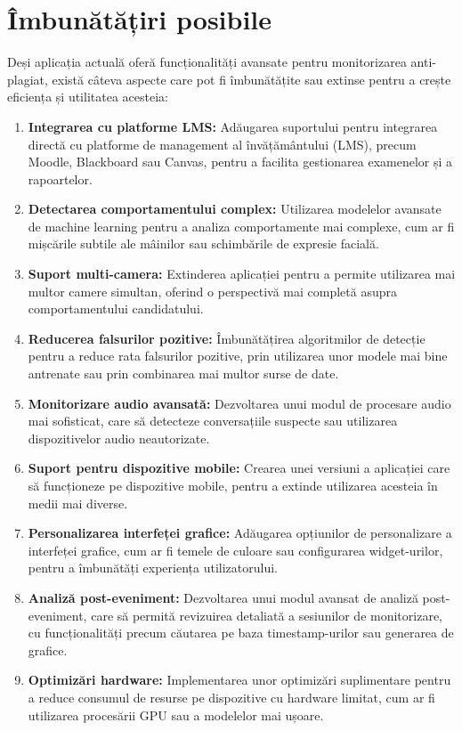 \documentclass[12pt,a4paper]{article}
\begin{document}
\section{Îmbunătățiri posibile}

Deși aplicația actuală oferă funcționalități avansate pentru monitorizarea anti-plagiat, există câteva aspecte care pot fi îmbunătățite sau extinse pentru a crește eficiența și utilitatea acesteia:

\begin{enumerate}
    \item \textbf{Integrarea cu platforme LMS:} Adăugarea suportului pentru integrarea directă cu platforme de management al învățământului (LMS), precum Moodle, Blackboard sau Canvas, pentru a facilita gestionarea examenelor și a rapoartelor.

    \item \textbf{Detectarea comportamentului complex:} Utilizarea modelelor avansate de machine learning pentru a analiza comportamente mai complexe, cum ar fi mișcările subtile ale mâinilor sau schimbările de expresie facială.

    \item \textbf{Suport multi-camera:} Extinderea aplicației pentru a permite utilizarea mai multor camere simultan, oferind o perspectivă mai completă asupra comportamentului candidatului.

    \item \textbf{Reducerea falsurilor pozitive:} Îmbunătățirea algoritmilor de detecție pentru a reduce rata falsurilor pozitive, prin utilizarea unor modele mai bine antrenate sau prin combinarea mai multor surse de date.

    \item \textbf{Monitorizare audio avansată:} Dezvoltarea unui modul de procesare audio mai sofisticat, care să detecteze conversațiile suspecte sau utilizarea dispozitivelor audio neautorizate.

    \item \textbf{Suport pentru dispozitive mobile:} Crearea unei versiuni a aplicației care să funcționeze pe dispozitive mobile, pentru a extinde utilizarea acesteia în medii mai diverse.

    \item \textbf{Personalizarea interfeței grafice:} Adăugarea opțiunilor de personalizare a interfeței grafice, cum ar fi temele de culoare sau configurarea widget-urilor, pentru a îmbunătăți experiența utilizatorului.

    \item \textbf{Analiză post-eveniment:} Dezvoltarea unui modul avansat de analiză post-eveniment, care să permită revizuirea detaliată a sesiunilor de monitorizare, cu funcționalități precum căutarea pe baza timestamp-urilor sau generarea de grafice.

    \item \textbf{Optimizări hardware:} Implementarea unor optimizări suplimentare pentru a reduce consumul de resurse pe dispozitive cu hardware limitat, cum ar fi utilizarea procesării GPU sau a modelelor mai ușoare.
\end{enumerate}
\end{document}
